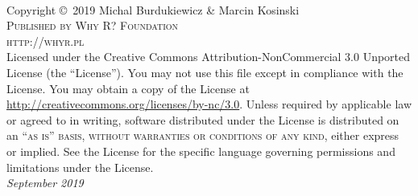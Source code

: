 \frontmatter



\newpage
~\vfill
\thispagestyle{empty}

\noindent Copyright \copyright\ 2019 Michal Burdukiewicz \& Marcin Kosinski\\ %

\noindent \textsc{Published by Why R? Foundation}\\ %

\noindent \textsc{http://whyr.pl}\\ %

\noindent Licensed under the Creative Commons Attribution-NonCommercial 3.0 Unported License (the ``License''). You may not use this file except in compliance with the License. You may obtain a copy of the License at \url{http://creativecommons.org/licenses/by-nc/3.0}. Unless required by applicable law or agreed to in writing, software distributed under the License is distributed on an \textsc{``as is'' basis, without warranties or conditions of any kind}, either express or implied. See the License for the specific language governing permissions and limitations under the License.\\ %

\noindent \textit{September 2019}

\mainmatter
